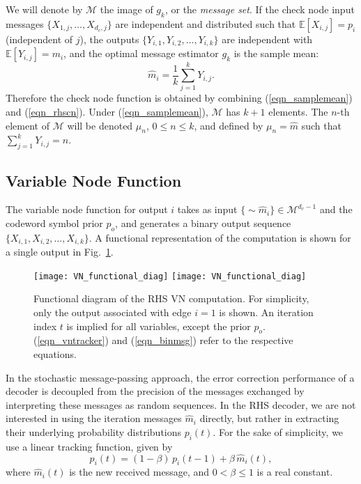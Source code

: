\documentclass[12pt,journal,twoside,draftcls,onecolumn]{IEEEtran}
\newcommand{\E}{\mathbb{E}}
\begin{document}
We will denote by $\mathcal{M}$ the image of $g_k$, or the \emph{message set}. If the check node input messages $\{X_{1,j}, \ldots, X_{d_c,j}\}$ are independent and distributed such that $\E[X_{i,j}] = p_i$ (independent of $j$), the outputs $\{Y_{i,1}, Y_{i,2}, \ldots , Y_{i,k}\}$ are independent with $\E[Y_{i,j}] = m_i$, and the optimal message estimator $g_{k}$ is the sample mean:
\begin{equation}
\label{eqn_samplemean}
 \hat{m}_i = \frac{1}{k} \sum_{j=1}^{k} Y_{i,j}.
\end{equation}
Therefore the check node function is obtained by combining (\ref{eqn_samplemean}) and (\ref{eqn_rhscn}).
Under (\ref{eqn_samplemean}), $\mathcal{M}$ has $k+1$ elements. The $n$-th element of $\mathcal{M}$ will be denoted $\mu_n$, $0 \leq n \leq k$, and defined by $\mu_n = \hat{m}$ such that $\sum_{j=1}^k Y_{i,j} = n$.


\subsection{Variable Node Function}

	The variable node function for output $i$ takes as input $\{\sim \!\! \hat{m}_i\} \in \mathcal{M}^{d_v-1}$ and the codeword symbol prior $p_o$, and generates a binary output sequence $\{X_{i,1}, X_{i,2}, \ldots , X_{i,k}\}$. A functional representation of the computation is shown for a single output in Fig.~\ref{fig_vnfunct}.
	

	\begin{figure}[tbp]
	\begin{center}
\ifCLASSOPTIONdraftcls
	\texttt{[image: VN\_functional\_diag]}
\else
	\texttt{[image: VN\_functional\_diag]}
\fi
	\caption{Functional diagram of the RHS VN computation. For simplicity, only the output associated with edge $i=1$ is shown. An iteration index $t$ is implied for all variables, except the prior $p_o$. (\ref{eqn_vntracker}) and (\ref{eqn_binmsg}) refer to the respective equations.}
	\label{fig_vnfunct}
	\end{center}
	\end{figure}

	
	In the stochastic message-passing approach, the error correction performance of a decoder is decoupled from the precision of the messages exchanged by interpreting these messages as random sequences.
	In the RHS decoder, we are not interested in using the iteration messages $\hat{m}_i$ directly, but rather in extracting their underlying probability distributions $p_i(t)$.
	For the sake of simplicity, we use a linear tracking function, given by
	\begin{equation}
	\label{eqn_vntracker}
	p_i(t) = (1 - \beta) \, p_i(t-1) + \beta \, \hat{m}_i(t),
	\end{equation}
	where $\hat{m}_i(t)$ is the new received message, and $0 < \beta \leq 1$ is a real constant.
	
\end{document}
